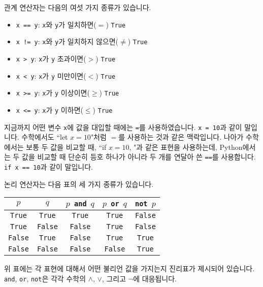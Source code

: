 \documentclass[../main.tex]{subfiles}
\begin{document}
관계 연산자는 다음의 여섯 가지 종류가 있습니다.
\begin{itemize}
  \item \texttt{x == y}: \texttt{x}와 \texttt{y}가 일치하면($=$) \texttt{True}
  \item \texttt{x != y}: \texttt{x}와 \texttt{y}가 일치하지 않으면($\neq$) \texttt{True}
  \item \texttt{x > y}: \texttt{x}가 \texttt{y} 초과이면($>$) \texttt{True}
  \item \texttt{x < y}: \texttt{x}가 \texttt{y} 미만이면($<$) \texttt{True}
  \item \texttt{x >= y}: \texttt{x}가 \texttt{y} 이상이면($\geq$) \texttt{True}
  \item \texttt{x <= y}: \texttt{x}가 \texttt{y} 이하면($\leq$) \texttt{True}
\end{itemize}
지금까지 어떤 변수 \texttt{x}에 값을 대입할 때에는 \texttt{=}를 사용하였습니다.
\texttt{x = 10}과 같이 말입니다.  수학에서도 ``let $x= 10$"처럼 $=$를 사용하는
것과 같은 맥락입니다.  나아가 수학에서는 보통 두 값을 비교할 때, ``if $x = 10$,
"과 같은 표현을 사용하는데, Python에서는 두 값을 비교할 때 단순히 등호 하나가
아니라 두 개를 연달아 쓴 \texttt{==}를 사용합니다.  \texttt{if x == 10}과 같이
말입니다.

논리 연산자는 다음 표의 세 가지 종류가 있습니다.
\begin{table}[H]
  \centering
  \begin{tabular}{c|c|c|c|c}
    $p$ & $q$ & \texttt{$p$ and $q$} & \texttt{$p$ or $q$} & \texttt{not $p$}\\ \hline
    \texttt{True} & \texttt{True} & \texttt{True} & \texttt{True} & \texttt{False}          \\
    \texttt{True} & \texttt{False} & \texttt{False} & \texttt{True} & \texttt{False}          \\
    \texttt{False} & \texttt{True} & \texttt{False} & \texttt{True} & \texttt{True}          \\
    \texttt{False} & \texttt{False} & \texttt{False} & \texttt{False} & \texttt{True}
  \end{tabular}
\end{table}
위 표에는 각 표현에 대해서 어떤 불리언 값을 가지는지 진리표가 제시되어 있습니다.
\texttt{and}, \texttt{or}, \texttt{not}은 각각 수학의 $\wedge$, $\vee$, 그리고 $\neg$에 대응됩니다.
\end{document}
